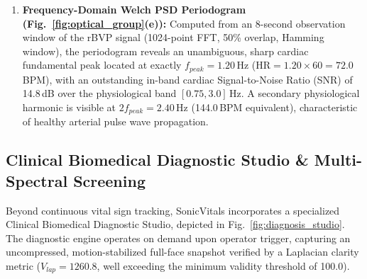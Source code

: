 \documentclass[journal]{IEEEtran}
\begin{document}
\begin{enumerate}
\begin{itemize}
        \item Sub-band $D_2$ ($0.75$--$3.0$\,Hz) captures the fundamental hemodynamic cardiac pulsatility with maximum signal fidelity;
        \item Sub-band $D_1$ ($>3.0$\,Hz) isolates sensor high-frequency thermal noise and ambient fluorescent lighting harmonics ($100/120$\,Hz aliases).
    \end{itemize}
    \item \textbf{Frequency-Domain Welch PSD Periodogram (Fig.~\ref{fig:optical_group}(e)):} Computed from an 8-second observation window of the rBVP signal (1024-point FFT, 50\% overlap, Hamming window), the periodogram reveals an unambiguous, sharp cardiac fundamental peak located at exactly $f_{peak} = 1.20$\,Hz ($\mathrm{HR} = 1.20 \times 60 = 72.0$\,BPM), with an outstanding in-band cardiac Signal-to-Noise Ratio (SNR) of 14.8\,dB over the physiological band $[0.75, 3.0]$\,Hz. A secondary physiological harmonic is visible at $2 f_{peak} = 2.40$\,Hz (144.0\,BPM equivalent), characteristic of healthy arterial pulse wave propagation.
\end{enumerate}

\subsection{Clinical Biomedical Diagnostic Studio \& Multi-Spectral Screening}

Beyond continuous vital sign tracking, SonicVitals incorporates a specialized Clinical Biomedical Diagnostic Studio, depicted in Fig.~\ref{fig:diagnosis_studio}. The diagnostic engine operates on demand upon operator trigger, capturing an uncompressed, motion-stabilized full-face snapshot verified by a Laplacian clarity metric ($V_{lap} = 1260.8$, well exceeding the minimum validity threshold of 100.0).
\end{document}
